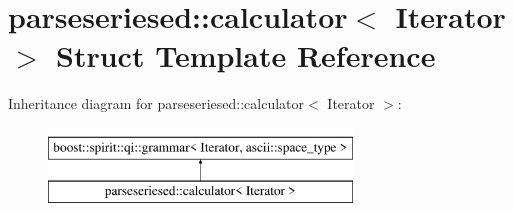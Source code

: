 \hypertarget{structparseseriesed_1_1calculator}{}\section{parseseriesed\+:\+:calculator$<$ Iterator $>$ Struct Template Reference}
\label{structparseseriesed_1_1calculator}
Inheritance diagram for parseseriesed\+:\+:calculator$<$ Iterator $>$\+:\begin{figure}[H]
\begin{center}
\leavevmode
\includegraphics[height=2.000000cm]{structparseseriesed_1_1calculator}
\end{center}
\end{figure}
